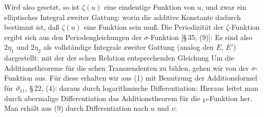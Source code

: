 
Wird also
gesetzt, so ist $\zeta(u)$ eine eindeutige Funktion von $u$, und zwar
ein elliptisches Integral zweiter Gattung:
worin die additive Konstante dadurch bestimmt ist, daß $\zeta(u)$
eine  Funktion sein muß. Die Periodizität der $\zeta$-Funktion
 ergibt sich aus den Periodengleichungen der $\sigma$-Funktion
[\S\,35, (9)]:
Es sind also $2\eta_1$ und $2\eta_2$ als vollständige Integrale zweiter
Gattung (analog den $E$, $E'$) dargestellt:
mit der der schen Relation entsprechenden Gleichung
Um die Additionstheoreme für die schen
Transzendenten zu bilden, gehen wir von der $\sigma$-Funktion aus.
Für diese erhalten wir aus (1) mit Benutzung der Additionsformel
 für $\vartheta_{11}$, \S\,22, (4):
daraus durch logarithmische Differentiation:
Hieraus leitet man durch abermalige Differentiation das
Additionstheorem für die $\wp$-Funktion her. Man erhält aus (9)
durch Differentiation nach $u$ und $v$:
